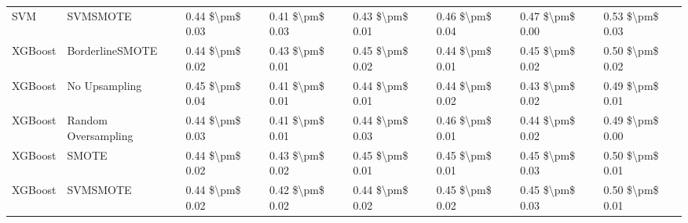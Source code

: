 \begin{tabular}{llllllll}
                            SVM &                      SVMSMOTE & 0.44 \$\textbackslash pm\$ 0.03 &           0.41 \$\textbackslash pm\$ 0.03 &       0.43 \$\textbackslash pm\$ 0.01 &        0.46 \$\textbackslash pm\$ 0.04 &                         0.47 \$\textbackslash pm\$ 0.00 &     0.53 \$\textbackslash pm\$ 0.03 \\
                        XGBoost &               BorderlineSMOTE & 0.44 \$\textbackslash pm\$ 0.02 &           0.43 \$\textbackslash pm\$ 0.01 &       0.45 \$\textbackslash pm\$ 0.02 &        0.44 \$\textbackslash pm\$ 0.01 &                         0.45 \$\textbackslash pm\$ 0.02 &     0.50 \$\textbackslash pm\$ 0.02 \\
                        XGBoost &                 No Upsampling & 0.45 \$\textbackslash pm\$ 0.04 &           0.41 \$\textbackslash pm\$ 0.01 &       0.44 \$\textbackslash pm\$ 0.01 &        0.44 \$\textbackslash pm\$ 0.02 &                         0.43 \$\textbackslash pm\$ 0.02 &     0.49 \$\textbackslash pm\$ 0.01 \\
                        XGBoost &           Random Oversampling & 0.44 \$\textbackslash pm\$ 0.03 &           0.41 \$\textbackslash pm\$ 0.01 &       0.44 \$\textbackslash pm\$ 0.03 &        0.46 \$\textbackslash pm\$ 0.01 &                         0.44 \$\textbackslash pm\$ 0.02 &     0.49 \$\textbackslash pm\$ 0.00 \\
                        XGBoost &                         SMOTE & 0.44 \$\textbackslash pm\$ 0.02 &           0.43 \$\textbackslash pm\$ 0.02 &       0.45 \$\textbackslash pm\$ 0.01 &        0.45 \$\textbackslash pm\$ 0.01 &                         0.45 \$\textbackslash pm\$ 0.03 &     0.50 \$\textbackslash pm\$ 0.01 \\
                        XGBoost &                      SVMSMOTE & 0.44 \$\textbackslash pm\$ 0.02 &           0.42 \$\textbackslash pm\$ 0.02 &       0.44 \$\textbackslash pm\$ 0.02 &        0.45 \$\textbackslash pm\$ 0.02 &                         0.45 \$\textbackslash pm\$ 0.03 &     0.50 \$\textbackslash pm\$ 0.01 \\
\bottomrule
\end{tabular}
